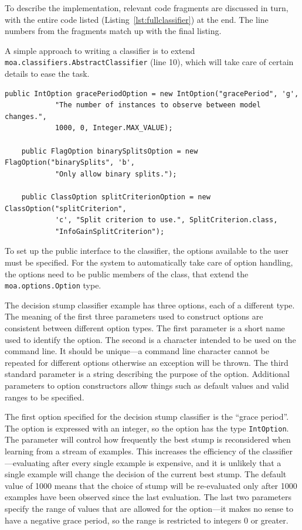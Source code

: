 \documentclass[a4paper,12pt,twoside]{book}
\begin{document}
To describe the implementation, relevant code fragments are discussed in turn, with the entire code listed (Listing~\ref{lst:fullclassifier}) at the end. The line numbers from the fragments match up with the final listing.

A simple approach to writing a classifier is to extend  \\ \verb+moa.classifiers.AbstractClassifier+ (line 10), which will take care of certain details to ease the task.

\begin{lstlisting}[caption={Option handling},label=lst:opthandle,firstnumber=14]
	public IntOption gracePeriodOption = new IntOption("gracePeriod", 'g',
			"The number of instances to observe between model changes.",
			1000, 0, Integer.MAX_VALUE);

	public FlagOption binarySplitsOption = new FlagOption("binarySplits", 'b',
			"Only allow binary splits.");

	public ClassOption splitCriterionOption = new ClassOption("splitCriterion",
			'c', "Split criterion to use.", SplitCriterion.class,
			"InfoGainSplitCriterion");
\end{lstlisting}

To set up the public interface to the classifier, the options available to the user must be specified. For the system to automatically take care of option handling, the options need to be public members of the class, that extend the \verb+moa.options.Option+ type.

The decision stump classifier example has three options, each of a different type.
The meaning of the first three parameters used to construct options are consistent between different option types. The first parameter is a short name used to identify the option. The second is a character intended to be used on the command line. It should be unique---a command line character cannot be repeated for different options otherwise an exception will be thrown. The third standard parameter is a string describing the purpose of the option. Additional parameters to option constructors allow things such as default values and valid ranges to be specified.

The first option specified for the decision stump classifier is the ``grace period''. The option is expressed with an integer, so the option has the type \verb+IntOption+. The parameter will control how frequently the best stump is reconsidered when learning from a stream of examples. This increases the efficiency of the classifier---evaluating after every single example is expensive, and it is unlikely that a single example will change the decision of the current best stump. The default value of 1000 means that the choice of stump will be re-evaluated only after 1000 examples have been observed since the last evaluation. The last two parameters specify the range of values that are allowed for the option---it makes no sense to have a negative grace period, so the range is restricted to integers 0 or greater.
\end{document}
